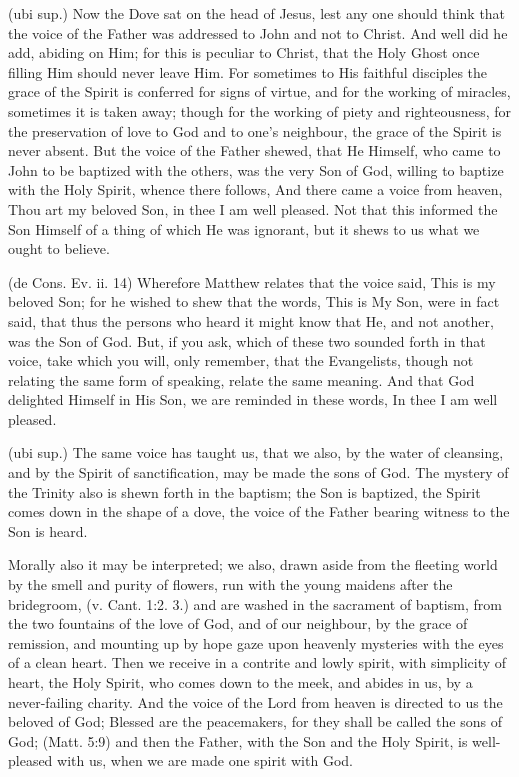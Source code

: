  (ubi sup.) Now the Dove sat on the head of Jesus, lest any one should think that the voice of the Father was addressed to John and not to Christ. And well did he add, abiding on Him; for this is peculiar to Christ, that the Holy Ghost once filling Him should never leave Him. For sometimes to His faithful disciples the grace of the Spirit is conferred for signs of virtue, and for the working of miracles, sometimes it is taken away; though for the working of piety and righteousness, for the preservation of love to God and to one’s neighbour, the grace of the Spirit is never absent. But the voice of the Father shewed, that He Himself, who came to John to be baptized with the others, was the very Son of God, willing to baptize with the Holy Spirit, whence there follows, And there came a voice from heaven, Thou art my beloved Son, in thee I am well pleased. Not that this informed the Son Himself of a thing of which He was ignorant, but it shews to us what we ought to believe.

 (de Cons. Ev. ii. 14) Wherefore Matthew relates that the voice said, This is my beloved Son; for he wished to shew that the words, This is My Son, were in fact said, that thus the persons who heard it might know that He, and not another, was the Son of God. But, if you ask, which of these two sounded forth in that voice, take which you will, only remember, that the Evangelists, though not relating the same form of speaking, relate the same meaning. And that God delighted Himself in His Son, we are reminded in these words, In thee I am well pleased.

 (ubi sup.) The same voice has taught us, that we also, by the water of cleansing, and by the Spirit of sanctification, may be made the sons of God. The mystery of the Trinity also is shewn forth in the baptism; the Son is baptized, the Spirit comes down in the shape of a dove, the voice of the Father bearing witness to the Son is heard.

 Morally also it may be interpreted; we also, drawn aside from the fleeting world by the smell and purity of flowers, run with the young maidens after the bridegroom, (v. Cant. 1:2. 3.) and are washed in the sacrament of baptism, from the two fountains of the love of God, and of our neighbour, by the grace of remission, and mounting up by hope gaze upon heavenly mysteries with the eyes of a clean heart. Then we receive in a contrite and lowly spirit, with simplicity of heart, the Holy Spirit, who comes down to the meek, and abides in us, by a never-failing charity. And the voice of the Lord from heaven is directed to us the beloved of God; Blessed are the peacemakers, for they shall be called the sons of God; (Matt. 5:9) and then the Father, with the Son and the Holy Spirit, is well-pleased with us, when we are made one spirit with God.

